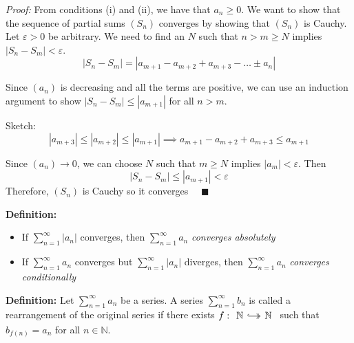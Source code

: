 \documentclass[12pt]{report}
\newcommand{\N}{\mathbb{N}}
\newcommand{\qed}{\quad \blacksquare}
\newcommand{\abs}[1]{\left\vert #1 \right\vert}
\newcommand{\ep}{\varepsilon}
\newenvironment*{tbox}[2][gray]{
    \begin{tcolorbox}[
        parbox=false,
        colback=#1!5!white,
        colframe=#1!75!black,
        breakable,
        title={#2}
    ]}
    {\end{tcolorbox}}
\begin{document}
    \begin{tbox}{\textbf{Theorem (Alternating Series Test):} Let $(a_n)$ be a sequence satisfying
        \begin{enumerate}[label=(\alph*)]
            \item $a_1 \geq a_2 \geq \dots \geq a_n \geq a_{n+1} \geq \dots$ (Decreasing)
            \item $(a_n) \to 0$ (Converges to 0)
        \end{enumerate}
        Then the alternating series $\sum_{n=1}^{\infty} (-1)^{n+1}a_n$ converges.}

        \emph{Proof:} From conditions (i) and (ii), we have that $a_n \geq 0$. We want to show that the sequence of partial sums $(S_n)$ converges by showing that $(S_n)$ is Cauchy. Let $\ep > 0$ be arbitrary. We need to find an $N$ such that $n > m \geq N$ implies $\abs{S_n - S_m} < \ep$. 
        \[\abs{S_n - S_m} = \abs{a_{m+1} - a_{m+2} + a_{m+3} - \dots \pm a_n}\] 

        Since $(a_n)$ is decreasing and all the terms are positive, we can use an induction argument to show $\abs{S_n - S_m} \leq \abs{a_{m+1}}$ for all $n > m$. 
        
        Sketch: 
        \[\abs{a_{m+3}} \leq \abs{a_{m+2}} \leq \abs{a_{m+1}} \implies a_{m+1} - a_{m+2} + a_{m+3} \leq a_{m+1}\]

        Since $(a_n) \to 0$, we can choose $N$ such that $m \geq N$ implies $\abs{a_m} < \ep$. Then 
        \[\abs{S_n - S_m} \leq \abs{a_{m+1}} < \ep\]
        Therefore, $(S_n)$ is Cauchy so it converges $\qed$
    \end{tbox}

    \textbf{Definition:} 
    \begin{itemize}
        \item If $\sum_{n=1}^{\infty} \abs{a_n}$ converges, then $\sum_{n=1}^{\infty} a_n$ \emph{converges absolutely}
        \item If $\sum_{n=1}^{\infty} a_n$ converges but $\sum_{n=1}^{\infty} \abs{a_n}$ diverges, then $\sum_{n=1}^{\infty} a_n$ \emph{converges conditionally}
    \end{itemize}

    \textbf{Definition:} Let $\sum_{n=1}^{\infty} a_n$ be a series. A series $\sum_{n=1}^{\infty} b_n$ is called a rearrangement of the original series if there exists $f:\begin{tikzcd}
        \N \arrow[hook, two heads]{r} &[-10pt] \N
    \end{tikzcd}$ such that $b_{f(n)} = a_n$ for all $n \in \N$. 
\end{document}
